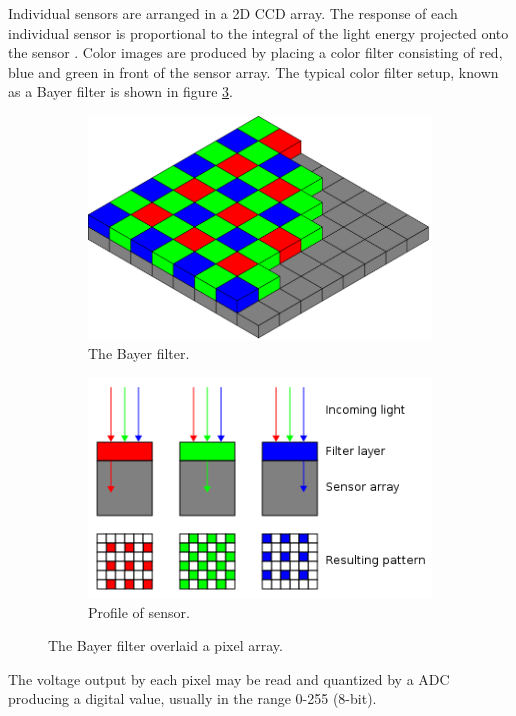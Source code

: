 Individual sensors are arranged in a 2D CCD array. The response of each individual sensor is proportional to the integral of the light energy projected onto the sensor \cite{digImage}. Color images are produced by placing a color filter consisting of red, blue and green in front of the sensor array. The typical color filter setup, known as a Bayer filter \cite{bayer1976color} is shown in figure \ref{fig:ccd_color}.
\begin{figure}[H]
\centering
\begin{subfigure}{.5\textwidth}
  \centering
  \includegraphics[width=.6\linewidth]{fig/700px-Bayer_pattern_on_sensor.png}
  \caption{The Bayer filter.}
  \label{fig:sub1}
\end{subfigure}%
\begin{subfigure}{.5\textwidth}
  \centering
  \includegraphics[width=.6\linewidth]{fig/375px-Bayer_pattern_on_sensor_profile.png}
  \caption{Profile of sensor.}
  \label{fig:sub2}
\end{subfigure}
\caption{The Bayer filter overlaid a pixel array.\protect\footnotemark}
\label{fig:ccd_color}
\end{figure}
The voltage output by each pixel may be read and quantized by a ADC producing a digital value, usually in the range 0-255 (8-bit).
